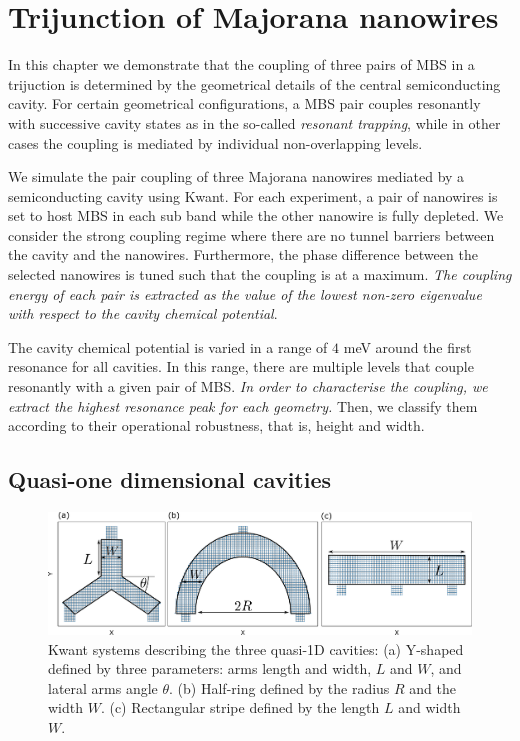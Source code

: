 \chapter{Trijunction of Majorana nanowires}

In this chapter we demonstrate that the coupling of three pairs of MBS in a trijuction is determined by the geometrical details of the central semiconducting cavity.
For certain geometrical configurations, a MBS pair couples resonantly with successive cavity states as in the so-called \textit{resonant trapping}, while in other cases the coupling is mediated by individual non-overlapping levels.

We simulate the pair coupling of three Majorana nanowires mediated by a semiconducting cavity using Kwant.
For each experiment, a pair of nanowires is set to host MBS in each sub band while the other nanowire is fully depleted.
We consider the strong coupling regime where there are no tunnel barriers between the cavity and the nanowires.
Furthermore, the phase difference between the selected nanowires is tuned such that the coupling is at a maximum.
\textit{The coupling energy of each pair is extracted as the value of the lowest non-zero eigenvalue with respect to the cavity chemical potential}.

The cavity chemical potential is varied in a range of $4$ meV around the first resonance for all cavities.
In this range, there are multiple levels that couple resonantly with a given pair of MBS.
\textit{In order to characterise the coupling, we extract the highest resonance peak for each geometry.}
Then, we classify them according to their operational robustness, that is, height and width.

\section{Quasi-one dimensional cavities}

\begin{figure}[h!]
\centering
  \includegraphics[width=0.9\linewidth]{figures/1d_cavities.pdf}
  \caption{Kwant systems describing the three quasi-1D cavities: (a) Y-shaped defined by three parameters: arms length and width, $L$ and $W$, and lateral arms angle $\theta$. (b) Half-ring defined by the radius $R$ and the width $W$. (c) Rectangular stripe defined by the length $L$ and width $W$.}
  \label{fig:1d}
\end{figure}

